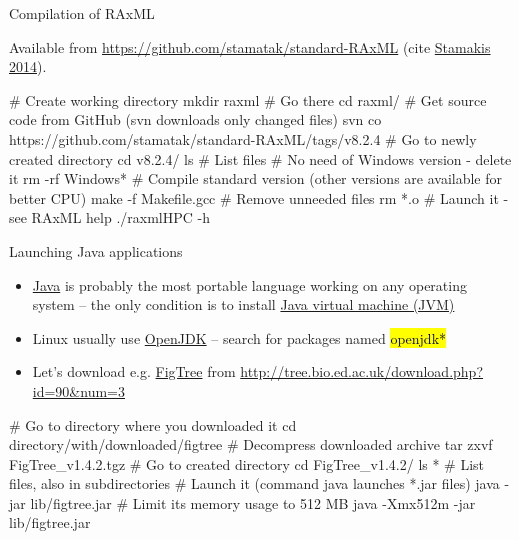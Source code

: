 \documentclass[compress, ucs, xelatex, 11pt, xcolor=svgnames,
  hyperref={
    bookmarks=true,
    unicode=true,
    colorlinks=true,
    pdftitle={Linux, command line and MetaCentrum},
    plainpages=false,
    pdfauthor={Vojtech Zeisek},
    pdfsubject={Course about use of Linux command line, writing shell scripts and using MetaCentrum of CESNET},
    pdfcreator={XeLaTeX},
    pdfkeywords={Linux, GNU, BASH, shell, command line, MetaCentrum},
    linkcolor=DarkRed,
    anchorcolor=DarkBlue,
    citecolor=Indigo,
    filecolor=NavyBlue,
    menucolor=DarkMagenta,
    urlcolor=DarkBlue,
    pdftex},
  url={hyphens, lowtilde} %
  ]{beamer}
\renewcommand{\texttt}[1]{\hl{\ttfamily #1}}
\begin{document}
\begin{frame}[fragile]{Compilation of RAxML}
\begin{footnotesize}
  Available from \url{https://github.com/stamatak/standard-RAxML} (cite \href{https://bioinformatics.oxfordjournals.org/content/30/9/1312.abstract}{Stamakis 2014}).
\end{footnotesize}
  \begin{bashcode}
    # Create working directory
    mkdir raxml
    # Go there
    cd raxml/
    # Get source code from GitHub (svn downloads only changed files)
    svn co https://github.com/stamatak/standard-RAxML/tags/v8.2.4
    # Go to newly created directory
    cd v8.2.4/
    ls # List files
    # No need of Windows version - delete it
    rm -rf Windows*
    # Compile standard version (other versions are available for better CPU)
    make -f Makefile.gcc
    # Remove unneeded files
    rm *.o
    # Launch it - see RAxML help
    ./raxmlHPC -h
  \end{bashcode}
\end{frame}

\begin{frame}[fragile]{Launching Java applications}
\begin{itemize}
  \item \href{https://www.java.com/}{Java} is probably the most portable language working on any operating system -- the only condition is to install \href{https://en.wikipedia.org/wiki/Java_virtual_machine}{Java virtual machine (JVM)}
  \item Linux usually use \href{http://openjdk.java.net/}{OpenJDK} -- search for packages named \texttt{*openjdk*}
  \item Let's download e.g. \href{http://tree.bio.ed.ac.uk/software/figtree/}{FigTree} from \url{http://tree.bio.ed.ac.uk/download.php?id=90&num=3}
\end{itemize}
  \begin{bashcode}
    # Go to directory where you downloaded it
    cd directory/with/downloaded/figtree
    # Decompress downloaded archive
    tar zxvf FigTree_v1.4.2.tgz
    # Go to created directory
    cd FigTree_v1.4.2/
    ls * # List files, also in subdirectories
    # Launch it (command java launches *.jar files)
    java -jar lib/figtree.jar
    # Limit its memory usage to 512 MB
    java -Xmx512m -jar lib/figtree.jar
  \end{bashcode}
\end{frame}

\end{document}
